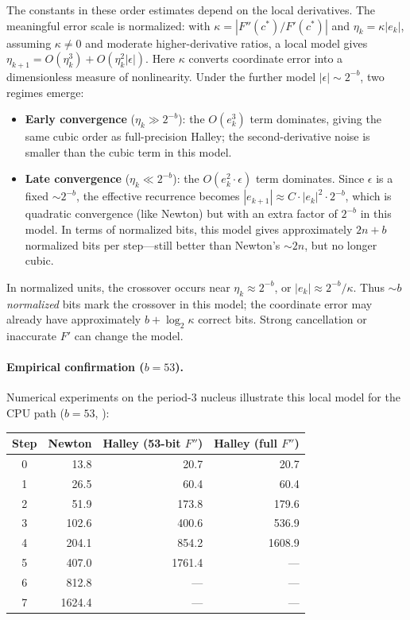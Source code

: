 The constants in these order estimates depend on the local derivatives.
The meaningful error scale is normalized: with
$\kappa=|F''(c^*)/F'(c^*)|$ and $\eta_k=\kappa|e_k|$, assuming
$\kappa\ne0$ and moderate higher-derivative ratios, a local model gives
$\eta_{k+1}=O(\eta_k^3)+O(\eta_k^2|\epsilon|)$.
Here $\kappa$ converts coordinate error into a dimensionless measure of
nonlinearity.  Under the further model $|\epsilon|\sim2^{-b}$, two regimes emerge:
\begin{itemize}
\item \textbf{Early convergence} ($\eta_k \gg 2^{-b}$): the $O(e_k^3)$ term
  dominates, giving the same cubic order as full-precision Halley; the
  second-derivative noise is smaller than the cubic term in this model.
\item \textbf{Late convergence} ($\eta_k \ll 2^{-b}$): the
  $O(e_k^2 \cdot \epsilon)$ term dominates.  Since $\epsilon$ is a fixed
  ${\sim}2^{-b}$, the effective recurrence becomes $|e_{k+1}| \approx
  C \cdot |e_k|^2 \cdot 2^{-b}$, which is quadratic convergence (like Newton)
  but with an extra factor of $2^{-b}$ in this model.  In terms of normalized bits,
  this model gives approximately $2n+b$ normalized bits per step---still better than Newton's
  ${\sim}2n$, but no longer cubic.
\end{itemize}

In normalized units, the crossover occurs near
$\eta_k\approx2^{-b}$, or $|e_k|\approx2^{-b}/\kappa$.
Thus ${\sim}b$ \emph{normalized} bits mark the crossover in this model;
the coordinate error may already have approximately $b+\log_2\kappa$
correct bits.  Strong cancellation or inaccurate $F'$ can change the model.

\paragraph{Empirical confirmation ($b = 53$).}
Numerical experiments on the period-3 nucleus illustrate this local model
for the CPU path ($b = 53$, ):

\begin{center}
\begin{tabular}{crrr}
\hline
\textbf{Step} & \textbf{Newton} & \textbf{Halley (53-bit $F''$)}
              & \textbf{Halley (full $F''$)} \\
\hline
0 &  13.8 &  20.7 &  20.7 \\
1 &  26.5 &  60.4 &  60.4 \\
2 &  51.9 & 173.8 & 179.6 \\
3 & 102.6 & 400.6 & 536.9 \\
4 & 204.1 & 854.2 & 1608.9 \\
5 & 407.0 & 1761.4 & --- \\
6 & 812.8 & --- & --- \\
7 & 1624.4 & --- & --- \\
\hline
\end{tabular}
\end{center}

